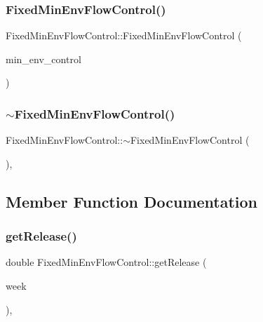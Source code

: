 \subsubsection{\texorpdfstring{Fixed\+Min\+Env\+Flow\+Control()}{FixedMinEnvFlowControl()}\hspace{0.1cm}{\footnotesize\ttfamily [2/2]}}
{\footnotesize\ttfamily Fixed\+Min\+Env\+Flow\+Control\+::\+Fixed\+Min\+Env\+Flow\+Control (\begin{DoxyParamCaption}\item[{const \mbox{\hyperlink{classFixedMinEnvFlowControl}{Fixed\+Min\+Env\+Flow\+Control}} \&}]{min\+\_\+env\+\_\+control }\end{DoxyParamCaption})}

\mbox{\label{classFixedMinEnvFlowControl_ac63298347dcaccf755ea45d1e2f94bad_ac63298347dcaccf755ea45d1e2f94bad}} 
\subsubsection{\texorpdfstring{$\sim$\+Fixed\+Min\+Env\+Flow\+Control()}{~FixedMinEnvFlowControl()}}
{\footnotesize\ttfamily Fixed\+Min\+Env\+Flow\+Control\+::$\sim$\+Fixed\+Min\+Env\+Flow\+Control (\begin{DoxyParamCaption}{ }\end{DoxyParamCaption})\hspace{0.3cm}{\ttfamily [override]}, {\ttfamily [default]}}



\subsection{Member Function Documentation}
\mbox{\label{classFixedMinEnvFlowControl_af3ef98eef6a7124738a3b54dcadf757f_af3ef98eef6a7124738a3b54dcadf757f}} 
\subsubsection{\texorpdfstring{get\+Release()}{getRelease()}}
{\footnotesize\ttfamily double Fixed\+Min\+Env\+Flow\+Control\+::get\+Release (\begin{DoxyParamCaption}\item[{int}]{week }\end{DoxyParamCaption})\hspace{0.3cm}{\ttfamily [override]}, {\ttfamily [virtual]}}



